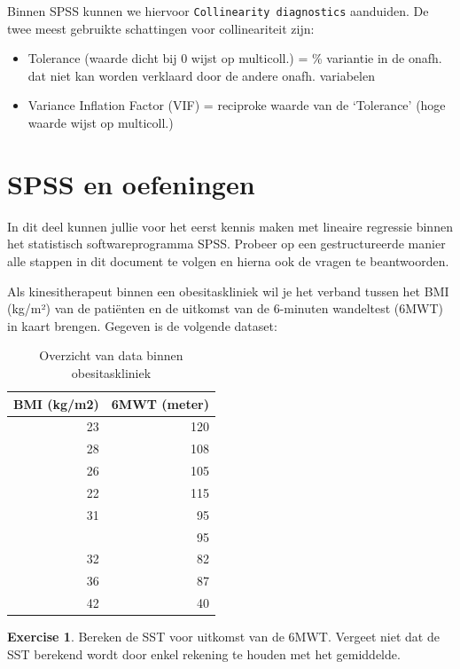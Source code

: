 \documentclass[
]{book}
\providecommand{\tightlist}{%
  \setlength{\itemsep}{0pt}\setlength{\parskip}{0pt}}
\theoremstyle{definition}
\theoremstyle{definition}
\theoremstyle{definition}
\newtheorem{exercise}{Exercise}[chapter]
\theoremstyle{definition}
\theoremstyle{remark}
\begin{document}
Binnen {SPSS} kunnen we hiervoor \texttt{Collinearity\ diagnostics} aanduiden. De twee meest gebruikte schattingen voor collineariteit zijn:

\begin{itemize}
\tightlist
\item
  Tolerance (waarde dicht bij 0 wijst op multicoll.) = \% variantie in de onafh. dat niet kan worden verklaard door de andere onafh. variabelen
\item
  Variance Inflation Factor (VIF) = reciproke waarde van de `Tolerance' (hoge waarde wijst op multicoll.)
\end{itemize}

\hypertarget{spss-en-oefeningen}{%
\section*{SPSS en oefeningen}\label{spss-en-oefeningen}}


In dit deel kunnen jullie voor het eerst kennis maken met lineaire regressie binnen het statistisch softwareprogramma SPSS. Probeer op een gestructureerde manier alle stappen in dit document te volgen en hierna ook de vragen te beantwoorden.

Als kinesitherapeut binnen een obesitaskliniek wil je het verband tussen het BMI (kg/m²) van de patiënten en de uitkomst van de 6-minuten wandeltest (6MWT) in kaart brengen. Gegeven is de volgende dataset:

\begin{table}

\caption{\label{tab:unnamed-chunk-14}Overzicht van data binnen obesitaskliniek}
\centering
\begin{tabular}[t]{rr}
\toprule
BMI (kg/m2) & 6MWT (meter)\\
\midrule
23 & 120\\
28 & 108\\
26 & 105\\
22 & 115\\
31 & 95\\
\addlinespace
26 & 95\\
32 & 82\\
36 & 87\\
42 & 40\\
\bottomrule
\end{tabular}
\end{table}

\begin{exercise}
Bereken de SST voor uitkomst van de 6MWT. Vergeet niet dat de SST berekend wordt door enkel rekening te houden met het gemiddelde.
\end{exercise}
\end{document}
